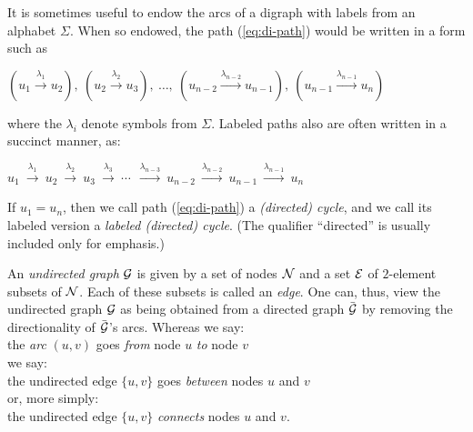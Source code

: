 \noindent {}
\bigskip

It is sometimes useful to endow the arcs of a digraph with labels from
an alphabet $\Sigma$.  When so endowed, the path (\ref{eq:di-path})
would be written in a form such as

\smallskip

\hspace*{.35in}$\displaystyle
(u_1 \stackrel{\lambda_1}{\rightarrow} u_2), \ 
(u_2 \stackrel{\lambda_2}{\rightarrow} u_3), \ \ldots, \ 
(u_{n-2} \stackrel{\lambda_{n-2}}{\rightarrow} u_{n-1}), \ 
(u_{n-1} \stackrel{\lambda_{n-1}}{\rightarrow} u_n)$

\smallskip

\noindent
where the $\lambda_i$ denote symbols from $\Sigma$.  Labeled paths
also are often written in a succinct manner, as:

\smallskip

\hspace*{.35in}$\displaystyle 
u_1 \ \stackrel{\lambda_1}{\rightarrow} \ u_2
    \ \stackrel{\lambda_2}{\rightarrow} \ u_3
    \ \stackrel{\lambda_3}{\rightarrow} \ \cdots \ 
    \ \stackrel{\lambda_{n-3}}{\rightarrow} \ u_{n-2}
    \ \stackrel{\lambda_{n-2}}{\rightarrow} \ u_{n-1}
    \  \stackrel{\lambda_{n-1}}{\rightarrow} \ u_n$

\medskip

If $u_1 = u_n$, then we call path (\ref{eq:di-path}) a {\em (directed)
  cycle}, and we call its labeled version
a {\em labeled (directed) cycle}.  (The qualifier ``directed'' is
usually included only for emphasis.)
\medskip

An {\em undirected graph} $\mbox{$\cal G$}$ is given by a set of nodes $\mbox{$\cal N$}$
and a set $\mbox{$\cal E$}$ 
of $2$-element subsets of $\mbox{$\cal N$}$.  Each of these subsets is called
an {\it edge}.
 
One can, thus, view the undirected graph $\mbox{$\cal G$}$ as being obtained from a
directed graph $\bar{\mbox{$\cal G$}}$ by removing the directionality of
$\bar{\mbox{$\cal G$}}$'s arcs.  Whereas we say: \\
\hspace*{.35in}the {\em arc} $(u,v)$ goes {\em from} node $u$ {\em to}
node $v$ \\
we say: \\
\hspace*{.35in}the undirected edge $\{u,v\}$ goes {\em between} nodes
$u$ and $v$ \\
or, more simply: \\
\hspace*{.35in}the undirected edge $\{u,v\}$ {\em connects} nodes $u$
and $v$.  
\medskip

